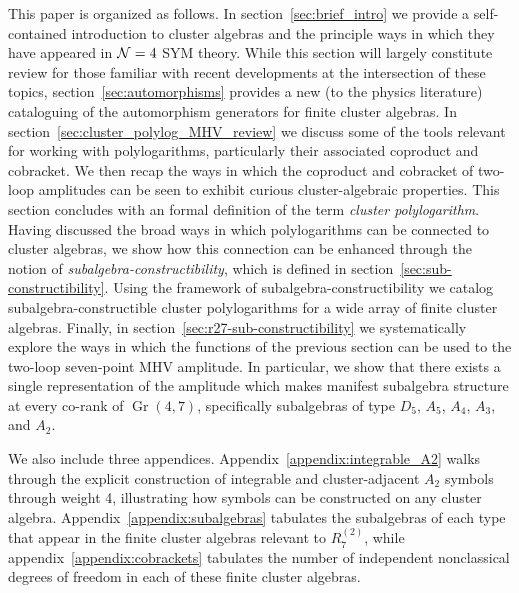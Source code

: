 \documentclass[11pt]{article}
\DeclareMathOperator{\Gr}{Gr}
\begin{document}
This paper is organized as follows. In section~\ref{sec:brief_intro} we provide a self-contained introduction to cluster algebras and the principle ways in which they have appeared in ${\cal N} =4$ SYM theory. While this section will largely constitute review for those familiar with recent developments at the intersection of these topics, section~\ref{sec:automorphisms} provides a new (to the physics literature) cataloguing of the automorphism generators for finite cluster algebras. In section~\ref{sec:cluster_polylog_MHV_review} we discuss some of the tools relevant for working with polylogarithms, particularly their associated coproduct and cobracket. We then recap the ways in which the coproduct and cobracket of two-loop amplitudes can be seen to exhibit curious cluster-algebraic properties. This section concludes with an formal definition of the term \emph{cluster polylogarithm}. Having discussed the broad ways in which polylogarithms can be connected to cluster algebras, we show how this connection can be enhanced through the notion of \emph{subalgebra-constructibility}, which is defined in section~\ref{sec:sub-constructibility}. Using the framework of subalgebra-constructibility we catalog subalgebra-constructible cluster polylogarithms for a wide array of finite cluster algebras. Finally, in section~\ref{sec:r27-sub-constructibility} we systematically explore the ways in which the functions of the previous section can be used to the two-loop seven-point MHV amplitude. In particular, we show that there exists a single representation of the amplitude which makes manifest subalgebra structure at every co-rank of $\Gr(4,7)$, specifically subalgebras of type $D_5$, $A_5$, $A_4$, $A_3$, and $A_2$. 

We also include three appendices. Appendix~\ref{appendix:integrable_A2} walks through the explicit construction of integrable and cluster-adjacent $A_2$ symbols through weight 4, illustrating how symbols can be constructed on any cluster algebra. Appendix~\ref{appendix:subalgebras} tabulates the subalgebras of each type that appear in the finite cluster algebras relevant to $R_7^{(2)}$, while appendix~\ref{appendix:cobrackets} tabulates the number of independent nonclassical degrees of freedom in each of these finite cluster algebras.


\end{document}
